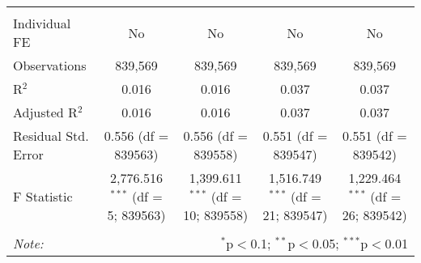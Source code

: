 \documentclass[
]{article}
\begin{document}
\begin{table}[!htbp]
{\begin{tabular}{@{\extracolsep{5pt}}lcccc}
\hline \\[-1.8ex] 
Individual FE & No & No & No & No \\ 
Observations & 839,569 & 839,569 & 839,569 & 839,569 \\ 
R$^{2}$ & 0.016 & 0.016 & 0.037 & 0.037 \\ 
Adjusted R$^{2}$ & 0.016 & 0.016 & 0.037 & 0.037 \\ 
Residual Std. Error & 0.556 (df = 839563) & 0.556 (df = 839558) & 0.551 (df = 839547) & 0.551 (df = 839542) \\ 
F Statistic & 2,776.516$^{***}$ (df = 5; 839563) & 1,399.611$^{***}$ (df = 10; 839558) & 1,516.749$^{***}$ (df = 21; 839547) & 1,229.464$^{***}$ (df = 26; 839542) \\ 
\hline 
\hline \\[-1.8ex] 
\textit{Note:}  & \multicolumn{4}{r}{$^{*}$p$<$0.1; $^{**}$p$<$0.05; $^{***}$p$<$0.01} \\ 
\end{tabular}
} 
\end{table} 
\newpage
\end{document}

